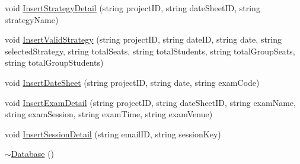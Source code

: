 \begin{DoxyCompactItemize}
\item 
void \hyperlink{classDatabase_a8a13b478ab9c5c9fabc07b9513530bc0}{Insert\-Strategy\-Detail} (string project\-I\-D, string date\-Sheet\-I\-D, string strategy\-Name)
\item 
void \hyperlink{classDatabase_ae20d8dbfb3d8755cd4cf508a503fd9b6}{Insert\-Valid\-Strategy} (string project\-I\-D, string date\-I\-D, string date, string selected\-Strategy, string total\-Seats, string total\-Students, string total\-Group\-Seats, string total\-Group\-Students)
\item 
void \hyperlink{classDatabase_ab410079853d849a9104be0689abee878}{Insert\-Date\-Sheet} (string project\-I\-D, string date, string exam\-Code)
\item 
void \hyperlink{classDatabase_a1c68383f46e3c3026ff53aeb4e5f76ab}{Insert\-Exam\-Detail} (string project\-I\-D, string date\-Sheet\-I\-D, string exam\-Name, string exam\-Session, string exam\-Time, string exam\-Venue)
\item 
void \hyperlink{classDatabase_a61963a0b66aca78ffa950b22ee959c47}{Insert\-Session\-Detail} (string email\-I\-D, string session\-Key)
\item 
\hyperlink{classDatabase_a84d399a2ad58d69daab9b05330e1316d}{$\sim$\-Database} ()
\end{DoxyCompactItemize}
